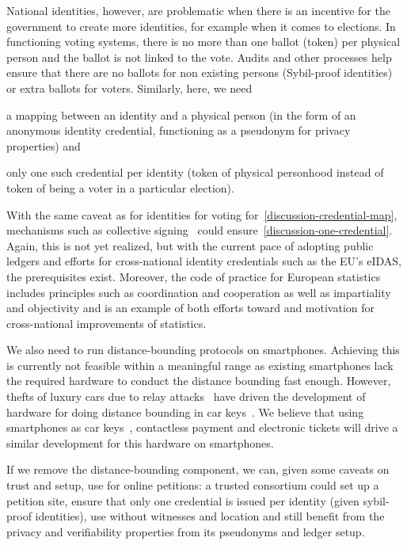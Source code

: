 National identities, however, are problematic when there is an
incentive for the government to create more identities, for example
when it comes to elections.  In functioning voting systems, there is
no more than one ballot (token) per physical person and the ballot is
not linked to the vote. Audits and other processes help ensure that
there are no ballots for non existing persons (Sybil-proof identities)
or extra ballots for voters. Similarly, here, we need
\begin{enumerate*}
\item\label{discussion-credential-map} a mapping between an identity and a 
  physical person (in the form of an anonymous identity credential, functioning 
  as a pseudonym for privacy
properties) and
\item\label{discussion-one-credential} only one such credential per identity 
  (token of physical personhood instead of token of being a voter in a 
  particular election).
\end{enumerate*}
With the same caveat as for identities for voting 
for~\ref{discussion-credential-map}, mechanisms such as collective 
signing~\cite{collective-signing} could ensure~\ref{discussion-one-credential}.
Again, this is not yet realized, but with the current pace
of adopting public ledgers and efforts for cross-national identity
credentials such as the EU's eIDAS, the prerequisites exist. Moreover,
the code of practice for European statistics~\cite{EuroStat} includes 
principles such as coordination and cooperation as well as
impartiality and objectivity and is an example of both efforts toward
and motivation for cross-national improvements of statistics.


We also need to run distance-bounding protocols on smartphones.
Achieving this is currently not feasible within a meaningful range as
existing smartphones lack the required hardware to conduct the
distance bounding fast enough.  However, thefts of luxury cars due to
relay attacks~\cite[\eg][]{KeylessTheftVolvoXC90} have driven the development 
of hardware for doing
distance bounding in car keys~\cite[\eg][]{3db-access}.  We believe that using 
smartphones as car keys~\cite[\eg][]{iPhoneAsCarKey}, contactless payment and 
electronic tickets will drive a similar
development for this hardware on smartphones.

If we remove the distance-bounding component, we can, given some
caveats on trust and setup, use \CROCUS for online petitions: a
trusted consortium could set up a petition site, ensure that only one
credential is issued per identity (given sybil-proof identities), use \CROCUS 
without
witnesses and location and still benefit from the privacy and
verifiability properties from its pseudonyms and ledger setup.


